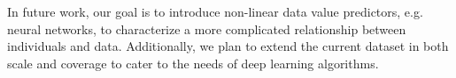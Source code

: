 \documentclass{mcmthesis}
\begin{document}
In future work, our goal is to introduce non-linear data value predictors, e.g. neural networks, to characterize a more complicated relationship between individuals and data. Additionally, we plan to extend the current dataset in both scale and coverage to cater to the needs of deep learning algorithms.



\end{document}
